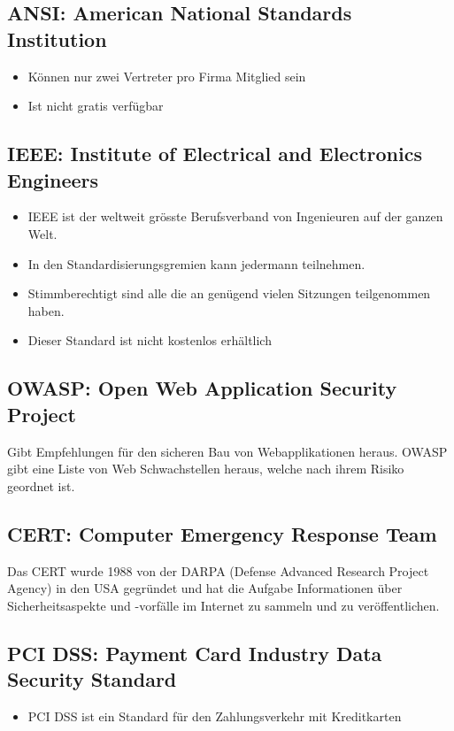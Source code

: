 \subsection{ANSI: American National Standards Institution}
\begin{itemize}
	\item Können nur zwei Vertreter pro Firma Mitglied sein
	\item Ist nicht gratis verfügbar
\end{itemize}

\subsection{IEEE: Institute of Electrical and Electronics Engineers}
\begin{itemize}
	\item IEEE ist der weltweit grösste Berufsverband von Ingenieuren auf der ganzen Welt. 
	\item In den Standardisierungsgremien kann jedermann teilnehmen. 
	\item Stimmberechtigt sind alle die an genügend vielen Sitzungen teilgenommen haben.
	\item Dieser Standard ist nicht kostenlos erhältlich
\end{itemize}

\subsection{OWASP: Open Web Application Security Project}
Gibt Empfehlungen für den sicheren Bau von Webapplikationen heraus. OWASP gibt eine Liste von Web Schwachstellen heraus, welche nach ihrem Risiko geordnet ist.

\subsection{CERT: Computer Emergency Response Team}
Das CERT wurde 1988 von der DARPA (Defense Advanced Research Project Agency) in den USA gegründet und hat die Aufgabe Informationen über Sicherheitsaspekte und -vorfälle im Internet zu sammeln und zu veröffentlichen.

\subsection{PCI DSS: Payment Card Industry Data Security Standard}
\begin{itemize}
	\item PCI DSS ist ein Standard für den Zahlungsverkehr mit Kreditkarten
\end{itemize}


